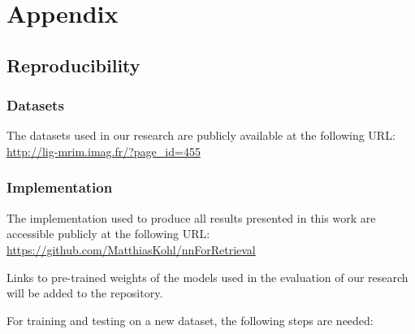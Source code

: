 
\appendix \chapter{Appendix}

\section{Reproducibility}
\subsection{Datasets}
The datasets used in our research are publicly available at the following
URL: \url{http://lig-mrim.imag.fr/?page_id=455}

\subsection{Implementation}
The implementation used to produce all results presented in this work
are accessible publicly at the following URL:
\url{https://github.com/MatthiasKohl/nnForRetrieval}

Links to pre-trained weights of the models used in the evaluation of our
research will be added to the repository.

For training and testing on a new dataset, the following steps are needed:

